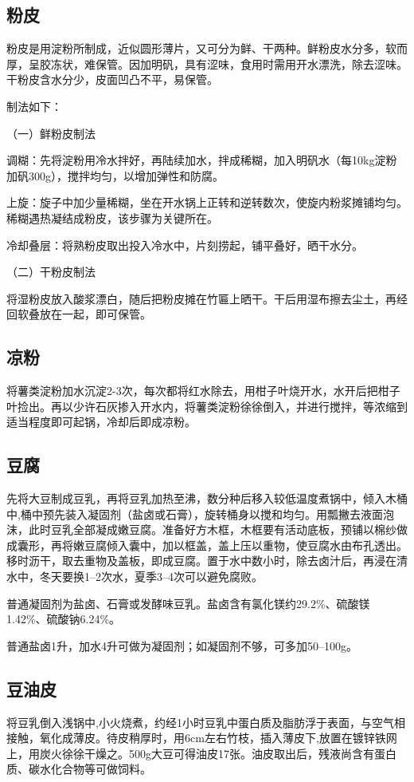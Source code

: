 \documentclass{ctexbook}
\begin{document}
\subsection{粉皮}
粉皮是用淀粉所制成，近似圆形薄片，又可分为鲜、干两种。鲜粉皮水分多，软而厚，呈胶冻状，难保管。因加明矾，具有涩味，食用时需用开水漂洗，除去涩味。干粉皮含水分少，皮面凹凸不平，易保管。

制法如下：

（一）鲜粉皮制法

调糊：先将淀粉用冷水拌好，再陆续加水，拌成稀糊，加入明矾水（每10kg淀粉加矾300g），搅拌均匀，以增加弹性和防腐。

上旋：旋子中加少量稀糊，坐在开水锅上正转和逆转数次，使旋内粉浆摊铺均匀。稀糊遇热凝结成粉皮，该步骤为关键所在。

冷却叠层：将熟粉皮取出投入冷水中，片刻捞起，铺平叠好，晒干水分。

（二）干粉皮制法

将湿粉皮放入酸浆漂白，随后把粉皮摊在竹匾上晒干。干后用湿布擦去尘土，再经回软叠放在一起，即可保管。
\subsection{凉粉}
将薯类淀粉加水沉淀2-3次，每次都将红水除去，用柑子叶烧开水，水开后把柑子叶捡出。再以少许石灰掺入开水内，将薯类淀粉徐徐倒入，并进行搅拌，等浓缩到适当程度即可起锅，冷却后即成凉粉。
\subsection{豆腐}
先将大豆制成豆乳，再将豆乳加热至沸，数分种后移入较低温度煮锅中，倾入木桶中,桶中预先装入凝固剂（盐卤或石膏），旋转桶身以搅和均匀。用瓢撇去液面泡沫，此时豆乳全部凝成嫩豆腐。准备好方木框，木框要有活动底板，预铺以棉纱做成囊形，再将嫩豆腐倾入囊中，加以框盖，盖上压以重物，使豆腐水由布孔透出。移时沥干，取去重物及盖板，即成豆腐。置于水中数小时，除去卤汁后，再浸在清水中，冬天要换1--2次水，夏季3--4次可以避免腐败。

普通凝固剂为盐卤、石膏或发酵味豆乳。盐卤含有氯化镁约29.2\%、硫酸镁1.42\%、硫酸钠6.24\%。

普通盐卤1升，加水4升可做为凝固剂；如凝固剂不够，可多加50--100g。
\subsection{豆油皮}
将豆乳倒入浅锅中,小火烧煮，约经1小时豆乳中蛋白质及脂肪浮于表面，与空气相接触，氧化成薄皮。待皮稍厚时，用6cm左右竹枝，插入薄皮下,放置在镀锌铁网上，用炭火徐徐干燥之。500g大豆可得油皮17张。油皮取出后，残液尚含有蛋白质、碳水化合物等可做饲料。
\end{document}

